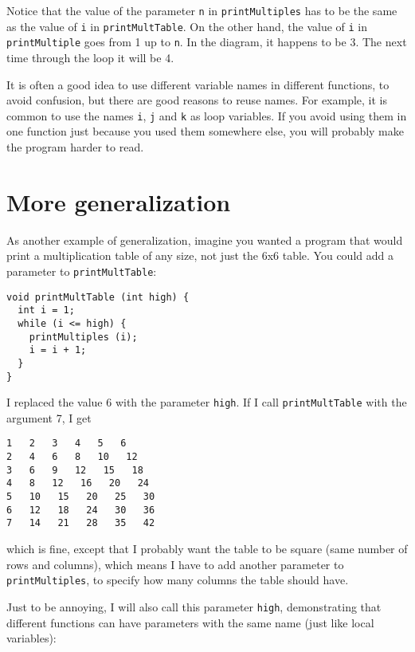\vspace{0.1in}
\centerline{}
\vspace{0.1in}
%
Notice that the value of the parameter {\tt n} in
{\tt printMultiples} has to be the same as the value
of {\tt i} in {\tt printMultTable}.  On the other hand,
the value of {\tt i} in {\tt printMultiple} goes
from 1 up to {\tt n}.  In the diagram, it happens to be 3.
The next time through the loop it will be 4.

It is often a good idea to use different variable names in
different functions, to avoid confusion, but there are good
reasons to reuse names.  For example, it is common to
use the names {\tt i}, {\tt j} and {\tt k} as loop variables.
If you avoid using them in one function just because you
used them somewhere else, you will probably make the program
harder to read.


\section{More generalization}

As another example of generalization, imagine you wanted
a program that would print a multiplication table of any
size, not just the 6x6 table.  You could add a parameter to
{\tt printMultTable}:

\begin{lstlisting}
void printMultTable (int high) {
  int i = 1;
  while (i <= high) {
    printMultiples (i);
    i = i + 1;
  }
}
\end{lstlisting}
%
I replaced the value 6 with the parameter {\tt high}.  If I
call {\tt printMultTable} with the argument 7, I get

\begin{lstlisting}
1   2   3   4   5   6   
2   4   6   8   10   12   
3   6   9   12   15   18   
4   8   12   16   20   24   
5   10   15   20   25   30   
6   12   18   24   30   36   
7   14   21   28   35   42   
\end{lstlisting}
%
which is fine, except that I probably want the table to
be square (same number of rows and columns), which means
I have to add another parameter to {\tt printMultiples},
to specify how many columns the table should have.

Just to be annoying, I will also call this parameter {\tt high},
demonstrating that different functions can have parameters
with the same name (just like local variables):

